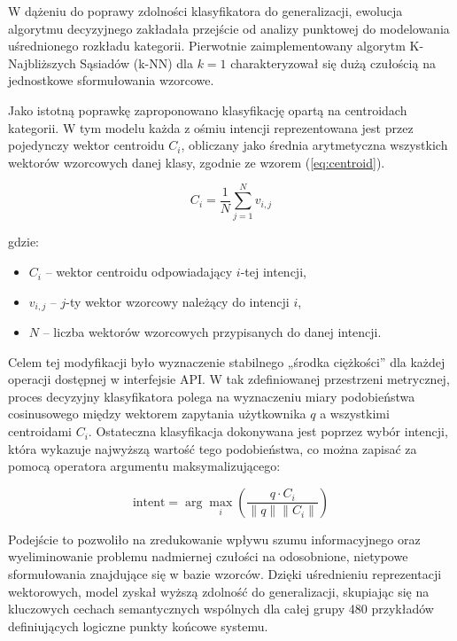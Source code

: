 W dążeniu do poprawy zdolności klasyfikatora do generalizacji, ewolucja algorytmu decyzyjnego zakładała przejście od analizy punktowej do modelowania uśrednionego rozkładu kategorii. Pierwotnie zaimplementowany algorytm K-Najbliższych Sąsiadów (k-NN) dla $k=1$ charakteryzował się dużą czułością na jednostkowe sformułowania wzorcowe.

Jako istotną poprawkę zaproponowano klasyfikację opartą na centroidach kategorii. W tym modelu każda z ośmiu intencji reprezentowana jest przez pojedynczy wektor centroidu $C_i$, obliczany jako średnia arytmetyczna wszystkich wektorów wzorcowych danej klasy, zgodnie ze wzorem (\ref{eq:centroid}).

\begin{equation}
    C_i = \frac{1}{N} \sum_{j=1}^{N} v_{i,j}
    \label{eq:centroid}
\end{equation}

\noindent gdzie:
\begin{itemize}
    \item $C_i$ -- wektor centroidu odpowiadający $i$-tej intencji,
    \item $v_{i,j}$ -- $j$-ty wektor wzorcowy należący do intencji $i$,
    \item $N$ -- liczba wektorów wzorcowych przypisanych do danej intencji.
\end{itemize}

Celem tej modyfikacji było wyznaczenie stabilnego „środka ciężkości” dla każdej operacji dostępnej w interfejsie API. W tak zdefiniowanej przestrzeni metrycznej, proces decyzyjny klasyfikatora polega na wyznaczeniu miary podobieństwa cosinusowego między wektorem zapytania użytkownika $q$ a wszystkimi centroidami $C_i$. Ostateczna klasyfikacja dokonywana jest poprzez wybór intencji, która wykazuje najwyższą wartość tego podobieństwa, co można zapisać za pomocą operatora argumentu maksymalizującego:

\begin{equation}
    \text{intent} = \arg\max_{i} \left( \frac{q \cdot C_i}{\|q\| \|C_i\|} \right)
\end{equation}

Podejście to pozwoliło na zredukowanie wpływu szumu informacyjnego oraz wyeliminowanie problemu nadmiernej czułości na odosobnione, nietypowe sformułowania znajdujące się w bazie wzorców. Dzięki uśrednieniu reprezentacji wektorowych, model zyskał wyższą zdolność do generalizacji, skupiając się na kluczowych cechach semantycznych wspólnych dla całej grupy 480 przykładów definiujących logiczne punkty końcowe systemu.

